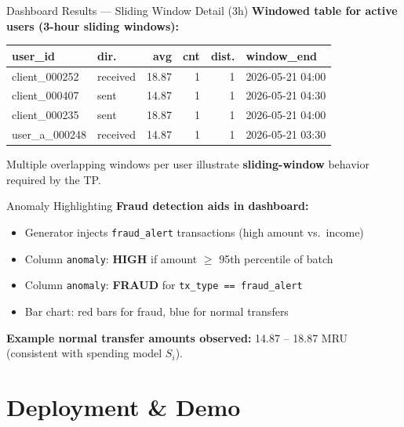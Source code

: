 \documentclass[aspectratio=169,11pt]{beamer}
\begin{document}
\begin{frame}{Dashboard Results — Sliding Window Detail (3h)}
  \footnotesize
  \textbf{Windowed table for active users (3-hour sliding windows):}
  \begin{table}
    \centering
    \begin{tabular}{@{}llrrrl@{}}
      \toprule
      \textbf{user\_id} & \textbf{dir.} & \textbf{avg} & \textbf{cnt} & \textbf{dist.} & \textbf{window\_end} \\
      \midrule
      client\_000252 & received & 18.87 & 1 & 1 & 2026-05-21 04:00 \\
      client\_000407 & sent     & 14.87 & 1 & 1 & 2026-05-21 04:30 \\
      client\_000235 & sent     & 18.87 & 1 & 1 & 2026-05-21 04:00 \\
      user\_a\_000248  & received & 14.87 & 1 & 1 & 2026-05-21 03:30 \\
      \bottomrule
    \end{tabular}
  \end{table}
  \vspace{0.3em}
  \normalsize
  Multiple overlapping windows per user illustrate \textbf{sliding-window} behavior required by the TP.
\end{frame}

\begin{frame}{Anomaly Highlighting}
  \textbf{Fraud detection aids in dashboard:}
  \begin{itemize}
    \item Generator injects \texttt{fraud\_alert} transactions (high amount vs.\ income)
    \item Column \texttt{anomaly}: \textbf{HIGH} if amount $\geq$ 95th percentile of batch
    \item Column \texttt{anomaly}: \textbf{FRAUD} for \texttt{tx\_type == fraud\_alert}
    \item Bar chart: red bars for fraud, blue for normal transfers
  \end{itemize}
  \vspace{0.5em}
  \textbf{Example normal transfer amounts observed:} 14.87 -- 18.87 MRU (consistent with spending model $S_i$).
\end{frame}

\section{Deployment \& Demo}
\end{document}
